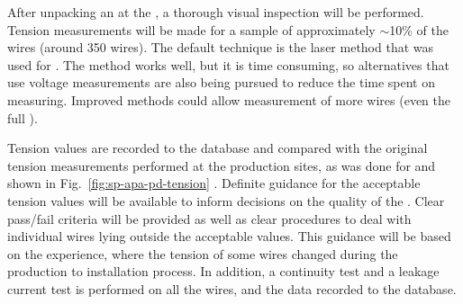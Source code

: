 \begin{comment}
\begin{dunetable}[QC List]{l|c|c}{tab:qclist}{List of tests performed for Quality Control upon reception at the integration facility}   
Test to perform   &  Number of wires/channels & Acceptable values, action\\ 
Visual inspection & All & > 99\% intact \\
Wire tension      & 10$\%$ sample & 5 $\pm$ \SI{1}{N}\\
Wire continuity   & All & $-$\\
Current leakage   & All & < X $\mu$A \\
Electronics connections & All & Perfect (> 99$\%$)\\
Cold test         & All & All intact (> 99$\%$)\\
\textbf{Overall}  & \textbf{All} & \textbf{At least 99$\%$ fully operational}\\
\end{dunetable}
\end{comment}

After unpacking an  at the , a thorough visual inspection will be performed. Tension measurements will be made for a sample of approximately $\sim$10\% of the wires (around \num{350} wires). The default technique is the laser method that was used for .  The method works well, but it is time consuming, so alternatives that use voltage measurements are also being pursued to reduce the time spent on measuring. Improved methods could allow measurement of more wires (even the full ). 

Tension values are recorded to the database and compared with the original tension measurements performed at the production sites, as was done for  and shown in Fig.~\ref{fig:sp-apa-pd-tension} . Definite guidance for the acceptable tension values will be available to inform decisions on the quality of the . Clear pass/fail criteria %
will be provided as well as clear procedures to deal with individual wires lying outside the acceptable values. %
This guidance will be based on the  experience, where the tension of some wires changed during the production to installation process. In addition, a continuity test and a leakage current test is performed on all the wires, and the data recorded to the database. 

